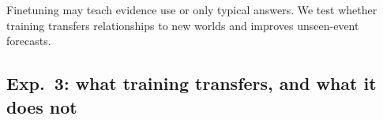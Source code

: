 \documentclass{article}
\begin{document}
Finetuning may teach evidence use or only typical answers. We test whether
training transfers relationships to new worlds and improves unseen-event forecasts.

\subsection{Exp.~3: what training transfers, and what it does not}
\label{sec:exp3}


\newcommand{\transfergridlines}{15}
%
%
\providecommand{\transfergridlines}{13}
\end{document}
